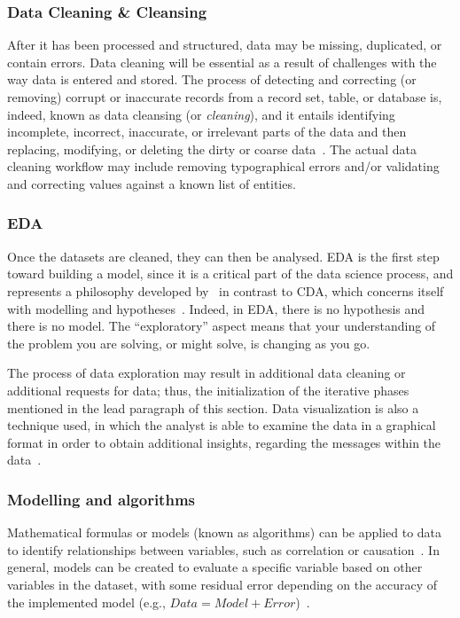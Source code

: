 \subsubsection{Data Cleaning \& Cleansing}
After it has been processed and structured, data may be missing, duplicated, or contain errors. Data cleaning will be essential as a result of challenges with the way data is entered and stored.
The process of detecting and correcting (or removing) corrupt or inaccurate records from a record set, table, or database is, indeed, known as data cleansing (or \textit{cleaning}),
and it entails identifying incomplete, incorrect, inaccurate, or irrelevant parts of the data and then replacing, modifying, or deleting the dirty or coarse data~\cite{Misc:2019_data_cleaning_wiki}.
The actual data cleaning workflow may include removing typographical errors and/or validating and correcting values against a known list of entities.

\subsubsection{\acl{EDA}}\label{subsubsec:eda}
Once the datasets are cleaned, they can then be analysed.
\ac{EDA} is the first step toward building a model, since it is a critical part of the data science process, and represents a philosophy developed by~\citeauthor{Article:future_of_data_tukey}
in contrast to \ac{CDA}, which concerns itself with modelling and hypotheses~\cite{Article:future_of_data_tukey}.
Indeed, in \ac{EDA}, there is no hypothesis and there is no model. The ``exploratory'' aspect means that your understanding of the problem you are solving, or might solve, is changing as you go.

The process of data exploration may result in additional data cleaning or additional requests for data; thus, the initialization of the iterative phases mentioned in the lead paragraph of this section.
Data visualization is also a technique used, in which the analyst is able to examine the data in a graphical format in order to obtain additional insights, regarding the messages within the data~\cite{Book:doing_data_science}.

\subsubsection{Modelling and algorithms}
Mathematical formulas or models (known as algorithms) can be applied to data to identify relationships between variables, such as correlation or causation~\cite{Book:pruneau_2017}.
In general, models can be created to evaluate a specific variable based on other variables in the dataset, with some residual error depending on the accuracy of the implemented model (e.g., $Data = Model + Error$)~\cite{Book:judd_1989_data_model}.

